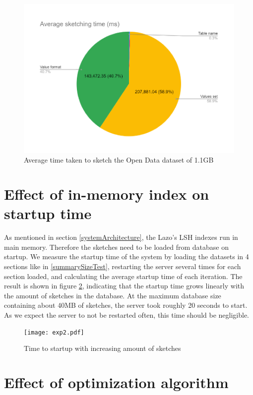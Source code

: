 \begin{figure}[ht]
    \centering
    \includegraphics[scale=0.6]{figures/exp1.pdf}
    \caption{Average time taken to sketch the Open Data dataset of 1.1GB}
    \label{fig:sketchtime}
\end{figure}

\section{Effect of in-memory index on startup time}

As mentioned in section \ref{systemArchitecture}, the Lazo's LSH indexes run in main memory. Therefore the sketches need to be loaded from database on startup. We measure the startup time of the system by loading the datasets in 4 sections like in \ref{summarySizeTest}, restarting the server several times for each section loaded, and calculating the average startup time of each iteration. The result is shown in figure \ref{fig:loadIndexTime}, indicating that the startup time grows linearly with the amount of sketches in the database. At the maximum database size containing about 40MB of sketches, the server took roughly 20 seconds to start. As we expect the server to not be restarted often, this time should be negligible.

\begin{figure}[ht]
    \centering
    \texttt{[image: exp2.pdf]}
    \caption{Time to startup with increasing amount of sketches}
    \label{fig:loadIndexTime}
\end{figure}

\section{Effect of optimization algorithm}

